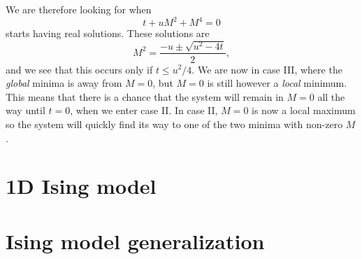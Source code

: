 \documentclass[11pt,letter, swedish, english
]{article}
\newcommand{\Tc}{\ensuremath{T_{\text{c}}}}
\begin{document}
We are therefore looking for when
\begin{equation}
t+uM^2+M^4=0
\end{equation}
starts having real solutions. These solutions are
\begin{equation}
M^2=\frac{-u\pm\sqrt{u^2-4t}}{2},
\end{equation}
and we see that this occurs only if $t\le u^2/4$. We are now in case
III, where the \emph{global} minima is away from $M=0$, but $M=0$ is
still however a \emph{local} minimum. This means that there is a
chance that the system will remain in $M=0$ all the way until $t=0$,
when we enter case II. In case II, $M=0$ is now a local maximum so the
system will quickly find its way to one of the two minima with
non-zero $M$. 




\section{1D Ising model}



\section{Ising model generalization}
\end{document}
